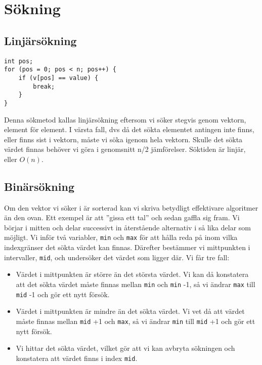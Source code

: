 \documentclass[11pt]{article}
\begin{document}
\section{Sökning}
\subsection{Linjärsökning}
\begin{lstlisting}
int pos;
for (pos = 0; pos < n; pos++) {
	if (v[pos] == value) {
		break;
	}
}
\end{lstlisting}
Denna sökmetod kallas linjärsökning eftersom vi söker stegvis genom vektorn, element för element. I värsta fall, dvs då det sökta elementet antingen inte finns, eller finns sist i vektorn, måste vi söka igenom hela vektorn. Skulle det sökta värdet finnas behöver vi göra i genomsnitt n/2 jämförelser. Söktiden är linjär, eller $O(n)$.

\subsection{Binärsökning}
Om den vektor vi söker i är sorterad kan vi skriva betydligt effektivare algoritmer än den ovan. Ett exempel är att ''gissa ett tal'' och sedan gaffla sig fram. Vi börjar i mitten och delar successivt in återstående alternativ i så lika delar som möjligt. Vi inför två variabler, \verb+min+ och \verb+max+ för att hålla reda på inom vilka indexgränser det sökta värdet kan finnas. Därefter bestämmer vi mittpunkten i intervaller, \verb+mid+, och undersöker det värdet som ligger där. Vi får tre fall: \\
\begin{itemize}
\item{Värdet i mittpunkten är större än det största värdet. Vi kan då konstatera att det sökta värdet måste finnas mellan \verb+min+ och \verb+min+ -1, så vi ändrar \verb+max+ till \verb+mid+ -1 och gör ett nytt försök.}
\item{Värdet i mittpunkten är mindre än det sökta värdet. Vi vet då att värdet måste finnas mellan \verb+mid+ +1 och \verb+max+, så vi ändrar \verb+min+ till \verb+mid+ +1 och gör ett nytt försök.} 
\item{Vi hittar det sökta värdet, vilket gör att vi kan avbryta sökningen och konstatera att värdet finns i index \verb+mid+.}
\end{itemize}
\end{document}
